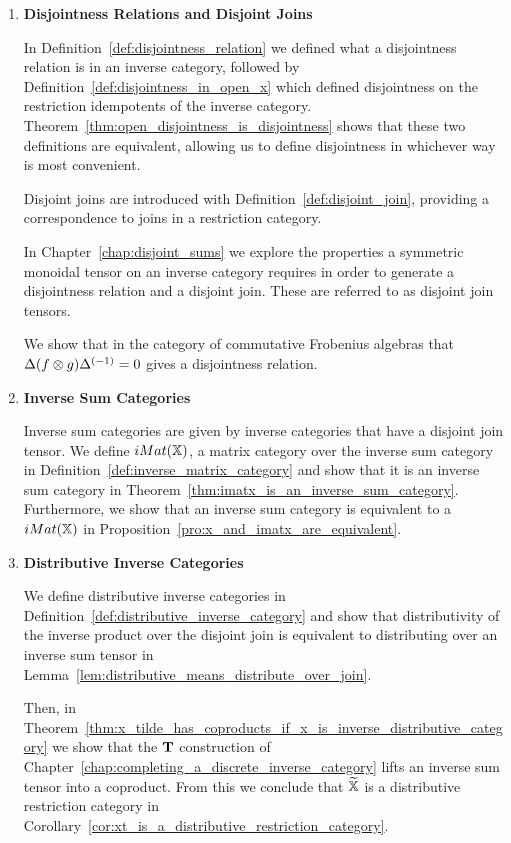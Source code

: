 \begin{enumerate}
\item \textbf{Disjointness Relations and Disjoint Joins}

In Definition~\ref{def:disjointness_relation} we defined what a disjointness relation is in an
inverse category, followed by Definition~\ref{def:disjointness_in_open_x} which defined disjointness
on the restriction idempotents of the inverse
category. Theorem~\ref{thm:open_disjointness_is_disjointness} shows that these two definitions are
equivalent, allowing us to define disjointness in whichever way is most convenient.

Disjoint joins are introduced with Definition~\ref{def:disjoint_join}, providing a correspondence to
joins in a restriction category.

In Chapter~\ref{chap:disjoint_sums} we explore the properties a symmetric monoidal tensor
on an inverse category requires in order to generate a disjointness relation and a disjoint
join. These are referred to as disjoint join tensors.

We show that in the category of commutative Frobenius algebras that $\Delta(f\otimes g){\Delta}^{(-1)} = 0$
gives a disjointness relation.

\item \textbf{Inverse Sum Categories}

Inverse sum categories are given by inverse categories that have a disjoint join tensor. We define
$iMat({\mathbb{X}})$, a matrix category over the inverse sum category \X in
Definition~\ref{def:inverse_matrix_category} and show that it is an inverse sum category in
Theorem~\ref{thm:imatx_is_an_inverse_sum_category}. Furthermore, we show
that an inverse sum category \X is equivalent to a $iMat({\mathbb{X}})$ in
Proposition~\ref{pro:x_and_imatx_are_equivalent}.


\item \textbf{Distributive Inverse Categories}

We define distributive inverse categories in Definition~\ref{def:distributive_inverse_category} and
show that distributivity of the inverse product over the disjoint join is equivalent to distributing
over an inverse sum tensor in Lemma~\ref{lem:distributive_means_distribute_over_join}.

Then, in Theorem~\ref{thm:x_tilde_has_coproducts_if_x_is_inverse_distributive_category} we show that
the $\mathbf{T}$ construction of Chapter~\ref{chap:completing_a_discrete_inverse_category} lifts an inverse sum
tensor into a coproduct. From this we conclude that $\widetilde{\mathbb{X}}$ is a distributive restriction category in
Corollary~\ref{cor:xt_is_a_distributive_restriction_category}.
\end{enumerate}

